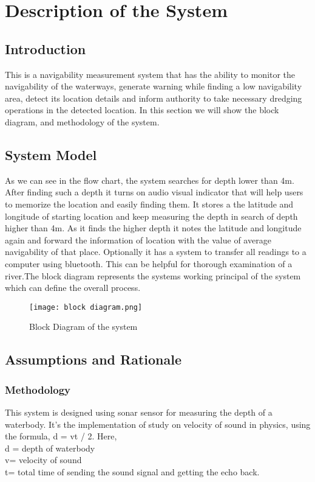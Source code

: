 \documentclass[12pt, top = 1 inch, bottom = 1 inch, left = 1.2 inch, top = .8 inch]{book}
\begin{document}
	\chapter{Description of the System}
		\section{Introduction}
		This is a navigability measurement system that has the ability to monitor the navigability of the waterways, generate warning while finding a low navigability area, detect its location details and inform authority to take necessary dredging operations in the detected location. In this section we will show the block diagram, and methodology of the system. 
		\section{System Model}
		As we can see in the flow chart, the system searches for depth lower than 4m. After finding such a depth it turns on audio visual indicator that will help users to memorize the location and easily finding them. It stores a the latitude and longitude of starting location and keep measuring the depth in search of depth higher than 4m. As it finds the higher depth it notes the latitude and longitude again and forward the information of location with the value of average navigability of that place. Optionally it has a system to transfer all readings to a computer using bluetooth. This can be helpful for thorough examination of a river.The block diagram represents the systems working principal of the system which can define the overall process. 
			\begin{figure}
				\centering
				\texttt{[image: block diagram.png]}
				\caption{Block Diagram of the system}
			\end{figure}
    		
		\section{Assumptions and Rationale}
			\subsection{Methodology}
			
			This system is designed using sonar sensor for measuring the depth of a waterbody. It’s the implementation of study on velocity of sound in physics, using the formula, d = vt / 2.
			Here,\\
			d = depth of waterbody\\
			v= velocity of sound\\
			t= total time of sending the sound signal and getting the echo back.\\
			
\end{document}
